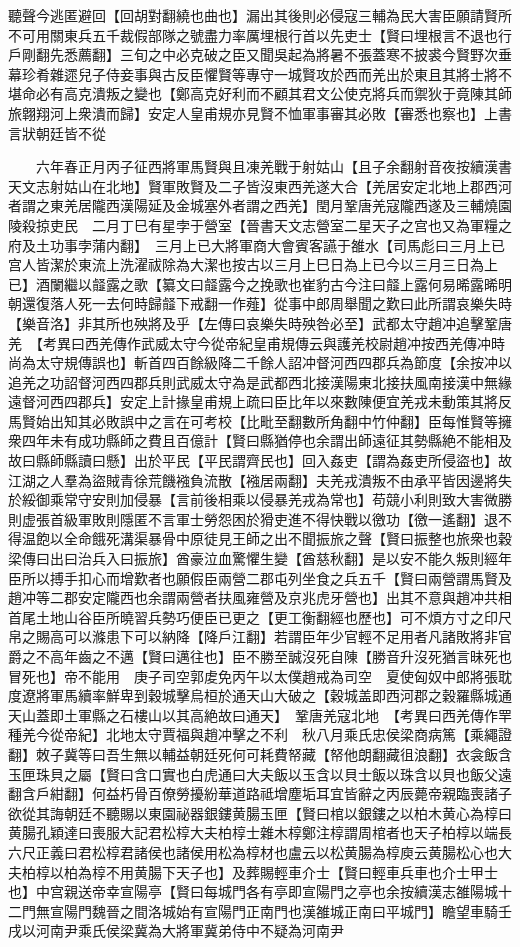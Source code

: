 聽聲今逃匿避回【回胡對翻繞也曲也】漏出其後則必侵寇三輔為民大害臣願請賢所不可用關東兵五千裁假部隊之號盡力率厲埋根行首以先吏士【賢曰埋根言不退也行戶剛翻先悉薦翻】三旬之中必克破之臣又聞吳起為將暑不張蓋寒不披裘今賢野次垂幕珍肴雜遝兒子侍妾事與古反臣懼賢等專守一城賢攻於西而羌出於東且其將士將不堪命必有高克潰叛之變也【鄭高克好利而不顧其君文公使克將兵而禦狄于竟陳其師旅翺翔河上衆潰而歸】安定人皇甫規亦見賢不恤軍事審其必敗【審悉也察也】上書言狀朝廷皆不從

　　六年春正月丙子征西將軍馬賢與且凍羌戰于射姑山【且子余翻射音夜按續漢書天文志射姑山在北地】賢軍敗賢及二子皆沒東西羌遂大合【羌居安定北地上郡西河者謂之東羌居隴西漢陽延及金城塞外者謂之西羌】閏月鞏唐羌寇隴西遂及三輔燒園陵殺掠吏民　二月丁巳有星孛于營室【晉書天文志營室二星天子之宫也又為軍糧之府及土功事孛蒲内翻】　三月上已大將軍商大會賓客讌于雒水【司馬彪曰三月上已宫人皆潔於東流上洗濯祓除為大潔也按古以三月上巳日為上已今以三月三日為上已】酒闌繼以䪥露之歌【纂文曰䪥露今之挽歌也崔豹古今注曰䪥上露何易晞露晞明朝還復落人死一去何時歸䪥下戒翻一作薤】從事中郎周舉聞之歎曰此所謂哀樂失時【樂音洛】非其所也殃將及乎【左傳曰哀樂失時殃咎必至】武都太守趙冲追擊鞏唐羌　【考異曰西羌傳作武威太守今從帝紀皇甫規傳云與護羌校尉趙冲按西羌傳冲時尚為太守規傳誤也】斬首四百餘級降二千餘人詔冲督河西四郡兵為節度【余按冲以追羌之功詔督河西四郡兵則武威太守為是武都西北接漢陽東北接扶風南接漢中無緣遠督河西四郡兵】安定上計掾皇甫規上疏曰臣比年以來數陳便宜羌戎未動策其將反馬賢始出知其必敗誤中之言在可考校【比毗至翻數所角翻中竹仲翻】臣每惟賢等擁衆四年未有成功縣師之費且百億計【賢曰縣猶停也余謂出師遠征其勢縣絶不能相及故曰縣師縣讀曰懸】出於平民【平民謂齊民也】回入姦吏【謂為姦吏所侵盜也】故江湖之人羣為盜賊青徐荒饑襁負流散【襁居兩翻】夫羌戎潰叛不由承平皆因邊將失於綏御乘常守安則加侵暴【言前後相乘以侵暴羌戎為常也】苟競小利則致大害微勝則虚張首級軍敗則隱匿不言軍士勞怨困於猾吏進不得快戰以徼功【徼一遙翻】退不得温飽以全命餓死溝渠暴骨中原徒見王師之出不聞振旅之聲【賢曰振整也旅衆也穀梁傳曰出曰治兵入曰振旅】酋豪泣血驚懼生變【酋慈秋翻】是以安不能久叛則經年臣所以搏手扣心而增歎者也願假臣兩營二郡屯列坐食之兵五千【賢曰兩營謂馬賢及趙冲等二郡安定隴西也余謂兩營者扶風雍營及京兆虎牙營也】出其不意與趙冲共相首尾土地山谷臣所曉習兵勢巧便臣已更之【更工衡翻經也歷也】可不煩方寸之印尺帛之賜高可以滌患下可以納降【降戶江翻】若謂臣年少官輕不足用者凡諸敗將非官爵之不高年齒之不邁【賢曰邁往也】臣不勝至誠沒死自陳【勝音升沒死猶言昧死也冒死也】帝不能用　庚子司空郭䖍免丙午以太僕趙戒為司空　夏使匈奴中郎將張耽度遼將軍馬續率鮮卑到穀城擊烏桓於通天山大破之【穀城盖即西河郡之穀羅縣城通天山蓋即土軍縣之石樓山以其高絶故曰通天】　鞏唐羌寇北地　【考異曰西羌傳作䍐種羌今從帝紀】北地太守賈福與趙冲擊之不利　秋八月乘氏忠侯梁商病篤【乘繩證翻】敇子冀等曰吾生無以輔益朝廷死何可耗費帑藏【帑他朗翻藏徂浪翻】衣衾飯含玉匣珠貝之屬【賢曰含口實也白虎通曰大夫飯以玉含以貝士飯以珠含以貝也飯父遠翻含戶紺翻】何益朽骨百僚勞擾紛華道路祗增塵垢耳宜皆辭之丙辰薨帝親臨喪諸子欲從其誨朝廷不聽賜以東園祕器銀鏤黄腸玉匣【賢曰棺以銀鏤之以柏木黄心為椁曰黄腸孔穎達曰喪服大記君松椁大夫柏椁士雜木椁鄭注椁謂周棺者也天子柏椁以端長六尺正義曰君松椁君諸侯也諸侯用松為椁材也盧云以松黄腸為椁庾云黄腸松心也大夫柏椁以柏為椁不用黄腸下天子也】及葬賜輕車介士【賢曰輕車兵車也介士甲士也】中宫親送帝幸宣陽亭【賢曰每城門各有亭即宣陽門之亭也余按續漢志雒陽城十二門無宣陽門魏晉之間洛城始有宣陽門正南門也漢雒城正南曰平城門】瞻望車騎壬戌以河南尹乘氏侯梁冀為大將軍冀弟侍中不疑為河南尹

